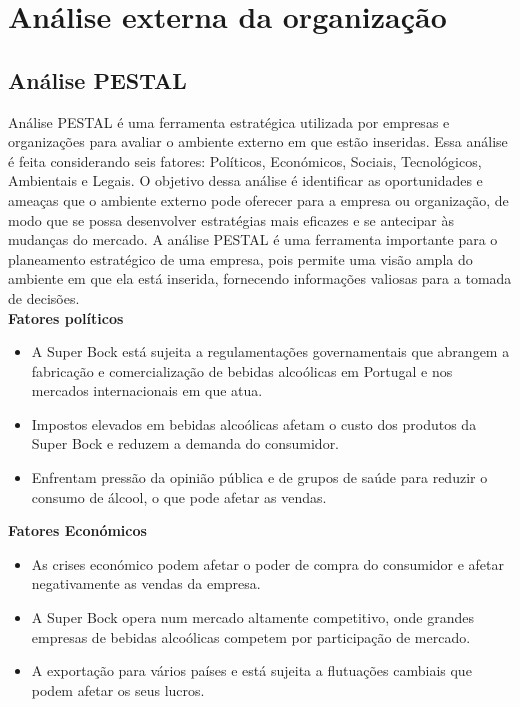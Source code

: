 \chapter{Análise externa da organização}
\label{Chapter3} %

\section{Análise PESTAL}

Análise PESTAL é uma ferramenta estratégica utilizada por empresas e organizações para avaliar o ambiente externo em que estão inseridas. Essa análise é feita considerando seis fatores: Políticos, Económicos, Sociais, Tecnológicos, Ambientais e Legais. O objetivo dessa análise é identificar as oportunidades e ameaças que o ambiente externo pode oferecer para a empresa ou organização, de modo que se possa desenvolver estratégias mais eficazes e se antecipar às mudanças do mercado. A análise PESTAL é uma ferramenta importante para o planeamento estratégico de uma empresa, pois permite uma visão ampla do ambiente em que ela está inserida, fornecendo informações valiosas para a tomada de decisões.\\


\noindent \textbf{Fatores políticos} %
\begin{itemize}
    \item A Super Bock está sujeita a regulamentações governamentais que abrangem a fabricação e comercialização de bebidas alcoólicas em Portugal e nos mercados internacionais em que atua.
    \item Impostos elevados em bebidas alcoólicas afetam o custo dos produtos da Super Bock e reduzem a demanda do consumidor.
    \item Enfrentam pressão da opinião pública e de grupos de saúde para reduzir o consumo de álcool, o que pode afetar as vendas.
\end{itemize}




\noindent \textbf{Fatores Económicos} %
\begin{itemize}
    \item As crises económico podem afetar o poder de compra do consumidor e afetar negativamente as vendas da empresa.
    \item A Super Bock opera num mercado altamente competitivo, onde grandes empresas de bebidas alcoólicas competem por participação de mercado.
    \item A exportação para vários países e está sujeita a flutuações cambiais que podem afetar os seus lucros.
\end{itemize}

